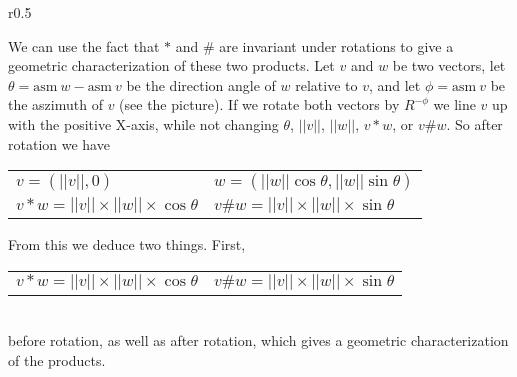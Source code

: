 \documentclass[12pt]{article}
\begin{document}
\begin{minipage}{\textwidth}\raggedright
\begin{wrapfigure}{r}{0.5\textwidth}
\end{wrapfigure}
We can use the fact that $*$ and $\#$ are invariant under
rotations to give a geometric characterization
of these two products.  Let $v$ and $w$ be two vectors, let
$\theta=\mathrm{asm}~w - \mathrm{asm}~v$ be the direction angle of $w$
relative to $v$, and let $\phi = \mathrm{asm}~v$ be the aszimuth of $v$
(see the picture).
If we rotate both vectors by $R^{-\phi}$
we line $v$ up with the positive X-axis, while not changing $\theta$,
$||v||$, $||w||$, $v*w$, or $v\#w$.  So after rotation we have
\hspace*{0.5in}
    \begin{tabular}{l@{~~~~~}l}
    $v=(||v||,0)$ &
    $w=(||w||\cos\theta,||w||\sin\theta)$ \\
    $v*w=||v||\times||w||\times\cos\theta$ & 
    $v\#w=||v||\times||w||\times\sin\theta$ \\
    \end{tabular}
\end{minipage}

From this we deduce two things.  First, \\
\hspace*{0.5in}
    \begin{tabular}{l@{~~~~~}l}
    $v*w=||v||\times||w||\times\cos\theta$ &
    $v\#w=||v||\times||w||\times\sin\theta$ \\
    \end{tabular} \\
before rotation, as well as after rotation,
which gives a geometric characterization of the products.
\end{document}
